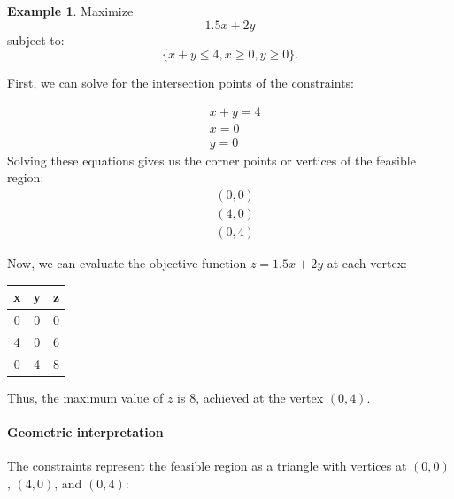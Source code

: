 \documentclass[oneside,11pt,dvipsnames]{book}
\numberwithin{equation}{section}
\theoremstyle{definition}
\newtheorem{example}{Example}[section]
\theoremstyle{remark}
\begin{document}
\begin{example}\label{ex:lp-example1}
Maximize 
\[
1.5x+2y
\] subject to:
\[
\{x+y \leq 4, x \geq 0, y \geq 0\}.
\]

First, we can solve for the intersection points of the constraints:

\[
\begin{aligned}
& x+y = 4 \\
& x = 0 \\
& y = 0
\end{aligned}
\]
Solving these equations gives us the corner points or vertices of the feasible region:
\[
\begin{aligned}
& (0,0) \\
& (4,0) \\
& (0,4)
\end{aligned}
\]

Now, we can evaluate the objective function $z = 1.5x+2y$ at each vertex:

\begin{center}
\begin{tabular}{ccc}
\hline
x & y & z \\
\hline
0 & 0 & 0 \\
4 & 0 & 6 \\
0 & 4 & 8 \\
\hline
\end{tabular}
\end{center}

Thus, the maximum value of $z$ is 8, achieved at the vertex $(0,4)$.


\paragraph{Geometric interpretation} The constraints represent the feasible region as a triangle with vertices at $(0,0)$, $(4,0)$, and $(0,4)$:

\begin{center}
\end{center}
\end{example}
\end{document}
